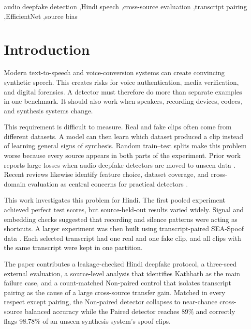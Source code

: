 \documentclass[3p,times,procedia]{elsarticle}
\begin{document}
\begin{frontmatter}
\begin{keyword}
audio deepfake detection \sep Hindi speech \sep cross-source evaluation
\sep transcript pairing \sep EfficientNet \sep source bias
\end{keyword}

\end{frontmatter}
\vspace*{-6pt}

\section{Introduction}
Modern text-to-speech and voice-conversion systems can create convincing
synthetic speech. This creates risks for voice authentication, media
verification, and digital forensics. A detector must therefore do more than
separate examples in one benchmark. It should also work when speakers,
recording devices, codecs, and synthesis systems change.

This requirement is difficult to measure. Real and fake clips often come
from different datasets. A model can then learn which dataset produced a
clip instead of learning general signs of synthesis. Random train--test
splits make this problem worse because every source appears in both parts of
the experiment. Prior work reports large losses when audio deepfake
detectors are moved to unseen data \cite{muller2022generalize,muller2024harder}.
Recent reviews likewise identify feature choice, dataset coverage, and
cross-domain evaluation as central concerns for practical detectors
\cite{salih2025review,zhang2025survey}.

This work investigates this problem for Hindi. The first pooled experiment achieved
perfect test scores, but source-held-out results varied widely. Signal and
embedding checks suggested that recording and silence patterns were acting
as shortcuts. A larger experiment was then built using transcript-paired
SEA-Spoof data \cite{wu2025seaspoof}. Each selected transcript had one real
and one fake clip, and all clips with the same transcript were kept in one
partition.

The paper contributes a leakage-checked Hindi deepfake protocol, a
three-seed external evaluation, a source-level analysis that identifies
Kathbath as the main failure case, and a count-matched Non-paired control
that isolates transcript pairing as the cause of a large cross-source
transfer gain. Matched in every respect except pairing, the Non-paired
detector collapses to near-chance cross-source balanced accuracy while the
Paired detector reaches 89\% and correctly flags 98.78\% of an unseen
synthesis system's spoof clips.
\end{document}
